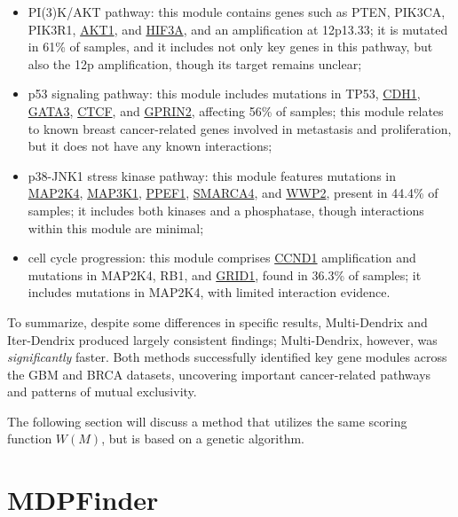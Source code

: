 \begin{itemize}
    \item PI(3)K/AKT pathway: this module contains genes such as PTEN, PIK3CA, PIK3R1, \href{https://en.wikipedia.org/wiki/AKT1}{AKT1}, and \href{https://en.wikipedia.org/wiki/HIF3A}{HIF3A}, and an amplification at 12p13.33; it is mutated in 61\% of samples, and it includes not only key genes in this pathway, but also the 12p amplification, though its target remains unclear;
    \item p53 signaling pathway: this module includes mutations in TP53, \href{https://en.wikipedia.org/wiki/Cadherin-1}{CDH1}, \href{https://en.wikipedia.org/wiki/GATA3}{GATA3}, \href{https://en.wikipedia.org/wiki/CTCF}{CTCF}, and \href{https://en.wikipedia.org/wiki/GPRIN2}{GPRIN2}, affecting 56\% of samples; this module relates to known breast cancer-related genes involved in metastasis and proliferation, but it does not have any known interactions;
    \item p38-JNK1 stress kinase pathway: this module features mutations in \href{https://en.wikipedia.org/wiki/MAP2K4}{MAP2K4}, \href{https://en.wikipedia.org/wiki/MAP3K1}{MAP3K1}, \href{https://en.wikipedia.org/wiki/PPEF1}{PPEF1}, \href{https://en.wikipedia.org/wiki/SMARCA4}{SMARCA4}, and \href{https://en.wikipedia.org/wiki/WWP2}{WWP2}, present in 44.4\% of samples; it includes both kinases and a phosphatase, though interactions within this module are minimal;
    \item cell cycle progression: this module comprises \href{https://en.wikipedia.org/wiki/Cyclin_D1}{CCND1} amplification and mutations in MAP2K4, RB1, and \href{https://en.wikipedia.org/wiki/GRID1}{GRID1}, found in 36.3\% of samples; it includes mutations in MAP2K4, with limited interaction evidence.
\end{itemize}

To summarize, despite some differences in specific results, Multi-Dendrix and Iter-Dendrix produced largely consistent findings; Multi-Dendrix, however, was \textit{significantly} faster. Both methods successfully identified key gene modules across the GBM and BRCA datasets, uncovering important cancer-related pathways and patterns of mutual exclusivity.

The following section will discuss a method that utilizes the same scoring function $W(M)$, but is based on a genetic algorithm.

\section{MDPFinder}

